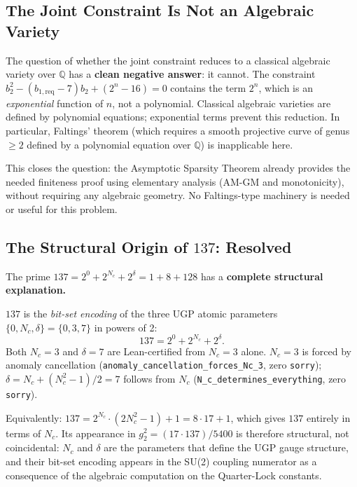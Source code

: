\documentclass[11pt]{article}
\theoremstyle{remark}
\newcommand{\Nc}{N_c}
\newcommand{\ddelta}{\delta}
\newcommand{\btwo}{b_2}
\newcommand{\bonereq}{b_{1,\mathrm{req}}}
\begin{document}
\subsection{The Joint Constraint Is Not an Algebraic Variety}
\label{subsec:not_variety}

The question of whether the joint constraint reduces to a classical algebraic variety
over $\mathbb{Q}$ has a \textbf{clean negative answer}: it cannot.
The constraint $\btwo^2 - (\bonereq-7)\btwo + (2^n-16) = 0$ contains the term $2^n$,
which is an \emph{exponential} function of $n$, not a polynomial.
Classical algebraic varieties are defined by polynomial equations; exponential
terms prevent this reduction.
In particular, Faltings' theorem (which requires a smooth projective curve of genus $\geq 2$
defined by a polynomial equation over $\mathbb{Q}$) is inapplicable here.

This closes the question: the Asymptotic Sparsity Theorem already provides the
needed finiteness proof using elementary analysis (AM-GM and monotonicity),
without requiring any algebraic geometry.
No Faltings-type machinery is needed or useful for this problem.

\subsection{The Structural Origin of $137$: Resolved}
\label{subsec:origin_137}

The prime $137 = 2^0 + 2^{\Nc} + 2^{\ddelta} = 1 + 8 + 128$
has a \textbf{complete structural explanation.}

$137$ is the \emph{bit-set encoding} of the three UGP atomic parameters
$\{0, \Nc, \ddelta\} = \{0, 3, 7\}$ in powers of 2:
\[
  137 = 2^0 + 2^{\Nc} + 2^{\ddelta}.
\]
Both $\Nc = 3$ and $\ddelta = 7$ are Lean-certified from $\Nc = 3$ alone.
$\Nc = 3$ is forced by anomaly cancellation
(\texttt{anomaly\_can\-cel\-la\-tion\_forces\_Nc\_3}, zero \texttt{sorry});
$\ddelta = \Nc + (\Nc^2-1)/2 = 7$ follows from $\Nc$
(\texttt{N\_c\_deter\-mines\_everything}, zero \texttt{sorry}).

Equivalently: $137 = 2^{\Nc} \cdot (2\Nc^2 - 1) + 1 = 8 \cdot 17 + 1$, which gives
$137$ entirely in terms of $\Nc$.
Its appearance in $g_2^2 = (17 \cdot 137)/5400$ is therefore structural, not
coincidental: $\Nc$ and $\ddelta$ are the parameters that define the UGP gauge
structure, and their bit-set encoding appears in the SU(2) coupling numerator
as a consequence of the algebraic computation on the Quarter-Lock constants.
\end{document}

